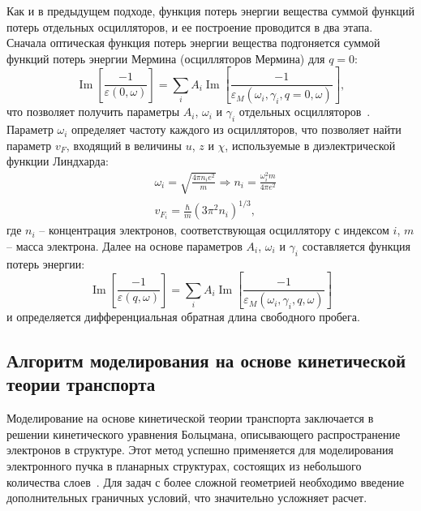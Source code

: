 Как и в предыдущем подходе, функция потерь энергии вещества суммой функций потерь отдельных осцилляторов, и ее построение проводится в два этапа. Сначала оптическая функция потерь энергии вещества подгоняется суммой функций потерь энергии Мермина (осцилляторов Мермина) для $q=0$:
\begin{equation}
	\operatorname{Im}\left[\frac{-1}{\varepsilon(0, \omega)}\right]=\sum_i A_i \operatorname{Im}\left[\frac{-1}{\varepsilon_M\left(\omega_i, \gamma_i, q=0, \omega\right)}\right],
\end{equation}
что позволяет получить параметры $A_i$, $\omega_i$ и $\gamma_i$ отдельных осцилляторов~\cite{DeVera_MELF_params}. Параметр $\omega_i$ определяет частоту каждого из осцилляторов, что позволяет найти параметр $v_F$, входящий в величины $u$, $z$ и $\chi$, используемые в диэлектрической функции Линдхарда:
\begin{equation}
	\begin{aligned}
		&\omega_i=\sqrt{\frac{4 \pi n_i e^2}{m}} \Rightarrow n_i=\frac{\omega_i^2 m}{4 \pi e^2} \\
		&v_{F_i}=\frac{\hbar}{m}\left(3 \pi^2 n_i\right)^{1/3},
	\end{aligned}
\end{equation}
где $n_i$ -- концентрация электронов, соответствующая осциллятору с индексом $i$, $m$ -- масса электрона. Далее на основе параметров $A_i$, $\omega_i$ и $\gamma_i$ составляется функция потерь энергии:
\begin{equation}
	\operatorname{Im}\left[\frac{-1}{\varepsilon(q, \omega)}\right]=\sum_i A_i \operatorname{Im}\left[\frac{-1}{\varepsilon_M\left(\omega_i, \gamma_i, q, \omega\right)}\right]
\end{equation}
и определяется дифференциальная обратная длина свободного пробега.


\subsection{Алгоритм моделирования на основе кинетической теории транспорта}
Моделирование на основе кинетической теории транспорта заключается в решении кинетического уравнения Больцмана, описывающего распространение электронов в структуре. Этот метод успешно применяется для моделирования электронного пучка в планарных структурах, состоящих из небольшого количества слоев~\cite{Stepanova_2006, Stepanova_2010}. Для задач с более сложной геометрией необходимо введение дополнительных граничных условий, что значительно усложняет расчет.


